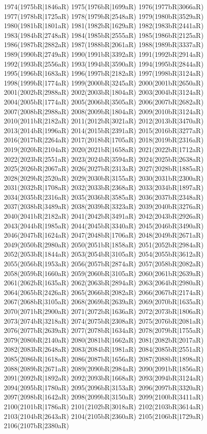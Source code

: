 1974(1975bR|1846aR) 1975(1976bR|1699aR) 1976(1977bR|3066aR) 1977(1978bR|1725aR) 1978(1979bR|2548aR) 1979(1980bR|3529aR) \\1980(1981bR|1801aR) 1981(1982bR|1629aR) 1982(1983bR|2441aR) 1983(1984bR|2748aR) 1984(1985bR|2555aR) 1985(1986bR|2125aR) 1986(1987bR|2882aR) 1987(1988bR|2061aR) 1988(1989bR|3337aR) \\1989(1990bR|2749aR) 1990(1991bR|3392aR) 1991(1992bR|2914aR) 1992(1993bR|2556aR) 1993(1994bR|3590aR) 1994(1995bR|2844aR) 1995(1996bR|1683aR) 1996(1997bR|2182aR) 1997(1998bR|3124aR) \\1998(1999bR|1774aR) 1999(2000bR|3245aR) 2000(2001bR|2650aR) 2001(2002bR|2988aR) 2002(2003bR|1804aR) 2003(2004bR|3124aR) 2004(2005bR|1774aR) 2005(2006bR|3505aR) 2006(2007bR|2682aR) \\2007(2008bR|2988aR) 2008(2009bR|1804aR) 2009(2010bR|3124aR) 2010(2011bR|2182aR) 2011(2012bR|3021aR) 2012(2013bR|3470aR) 2013(2014bR|1996aR) 2014(2015bR|2391aR) 2015(2016bR|3277aR) \\2016(2017bR|2264aR) 2017(2018bR|1705aR) 2018(2019bR|2316aR) 2019(2020bR|2104aR) 2020(2021bR|1658aR) 2021(2022bR|1712aR) 2022(2023bR|2551aR) 2023(2024bR|3594aR) 2024(2025bR|2638aR) \\2025(2026bR|2067aR) 2026(2027bR|2313aR) 2027(2028bR|1885aR) 2028(2029bR|2520aR) 2029(2030bR|3155aR) 2030(2031bR|2300aR) 2031(2032bR|1708aR) 2032(2033bR|2368aR) 2033(2034bR|1897aR) \\2034(2035bR|2316aR) 2035(2036bR|3585aR) 2036(2037bR|2348aR) 2037(2038bR|3489aR) 2038(2039bR|3323aR) 2039(2040bR|3276aR) 2040(2041bR|2182aR) 2041(2042bR|3491aR) 2042(2043bR|2926aR) \\2043(2044bR|1985aR) 2044(2045bR|3340aR) 2045(2046bR|3490aR) 2046(2047bR|1624aR) 2047(2048bR|1706aR) 2048(2049bR|2671aR) 2049(2050bR|2980aR) 2050(2051bR|1858aR) 2051(2052bR|2984aR) \\2052(2053bR|1844aR) 2053(2054bR|3105aR) 2054(2055bR|3612aR) 2055(2056bR|1953aR) 2056(2057bR|2874aR) 2057(2058bR|2082aR) 2058(2059bR|1660aR) 2059(2060bR|3105aR) 2060(2061bR|2639aR) \\2061(2062bR|1635aR) 2062(2063bR|2894aR) 2063(2064bR|2980aR) 2064(2065bR|2426aR) 2065(2066bR|2082aR) 2066(2067bR|2174aR) 2067(2068bR|3105aR) 2068(2069bR|2639aR) 2069(2070bR|1635aR) \\2070(2071bR|2900aR) 2071(2072bR|1636aR) 2072(2073bR|1806aR) 2073(2074bR|3218aR) 2074(2075bR|2308aR) 2075(2076bR|2081aR) 2076(2077bR|2639aR) 2077(2078bR|1634aR) 2078(2079bR|1755aR) \\2079(2080bR|2140aR) 2080(2081bR|1662aR) 2081(2082bR|2017aR) 2082(2083bR|2648aR) 2083(2084bR|1981aR) 2084(2085bR|2551aR) 2085(2086bR|1618aR) 2086(2087bR|1656aR) 2087(2088bR|1898aR) \\2088(2089bR|2671aR) 2089(2090bR|2984aR) 2090(2091bR|1856aR) 2091(2092bR|1892aR) 2092(2093bR|1668aR) 2093(2094bR|3124aR) 2094(2095bR|1780aR) 2095(2096bR|3153aR) 2096(2097bR|3320aR) \\2097(2098bR|1642aR) 2098(2099bR|3150aR) 2099(2100bR|3411aR) 2100(2101bR|1786aR) 2101(2102bR|3018aR) 2102(2103bR|3614aR) 2103(2104bR|2643aR) 2104(2105bR|2360aR) 2105(2106bR|1729aR) \\2106(2107bR|2380aR) 
